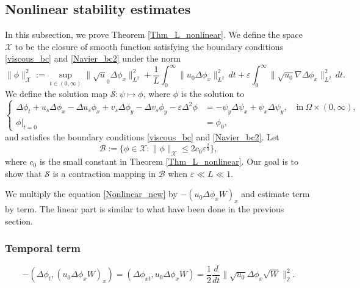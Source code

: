 \documentclass[reqno, 11pt]{amsart}
\theoremstyle{plain}
\theoremstyle{definition}
\theoremstyle{remark}
\numberwithin{equation}{section}
\newcommand\cB{\mathcal{B}}
\newcommand\cS{\mathcal{S}}
\newcommand\cX{\mathcal{X}}
\begin{document}
\subsection{Nonlinear stability estimates}\label{sec:L_nonlinear} In this subsection, we prove Theorem \ref{Thm_L_nonlinear}. We define the space $\cX$ to be the closure of smooth function satisfying the boundary conditions \eqref{viscous_bc} and \eqref{Navier_bc2} under the norm
$$
\| \phi \|_{\cX}^2:= \sup_{t \in (0,\infty)} \|\sqrt u_0 \Delta \phi_x\|_{L^2}^2 + \frac{1}{L} \int_0^\infty \| u_0 \Delta \phi_x \|_{L^2}^2 \, dt + \varepsilon \int_0^\infty  \| \sqrt{u_0} \nabla \Delta \phi_x \|_{L^2}^2 \, dt.
$$
We define the solution map $\cS: \psi \mapsto \phi$, where $\phi$ is the solution to
\begin{equation}\label{Nonlinear_new}
\left\{\begin{aligned}
\Delta \phi_t + u_s \Delta \phi_x - \Delta u_s \phi_x + v_s \Delta \phi_y - \Delta v_s \phi_y - \varepsilon \Delta^2 \phi &= -\psi_y \Delta \psi_x + \psi_x \Delta \psi_y, \quad \mbox{in}~\Omega \times (0,\infty),\\
\phi|_{t=0} &= \phi_0,
\end{aligned}\right.
\end{equation}
and satisfies the boundary conditions \eqref{viscous_bc} and \eqref{Navier_bc2}. Let 
$$
\cB := \{ \phi \in \cX : \| \phi \|_{\cX} \le 2 c_0 \varepsilon^{\frac{2}{3}} \},
$$
where $c_0$ is the small constant in Theorem \ref{Thm_L_nonlinear}. Our goal is to show that $\cS$ is a contraction mapping in $\cB$ when $\varepsilon \ll L \ll 1$.


We multiply the equation \eqref{Nonlinear_new} by $-(u_0 \Delta\phi_x W)_x$ and estimate term by term. The linear part is similar to what have been done in the previous section.

\subsubsection{Temporal term}
\begin{equation}\label{N_Tem}
-(\Delta \phi_t, (u_0 \Delta\phi_x W)_x) = (\Delta \phi_{xt}, u_0 \Delta\phi_x W) = \frac{1}{2} \frac{d}{dt} \|\sqrt{u_0} \Delta \phi_x \sqrt{W} \|_2^2.
\end{equation}
\end{document}
